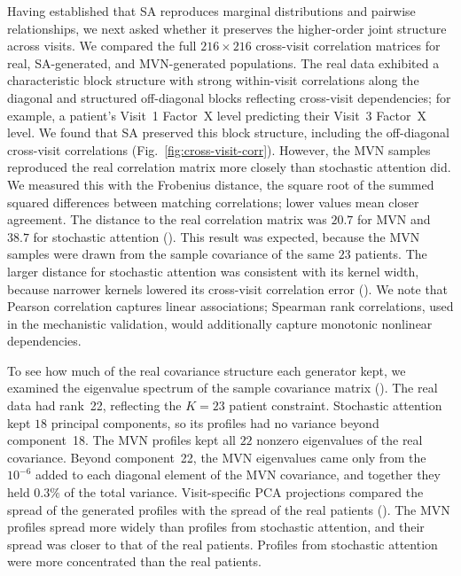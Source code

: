 Having established that SA reproduces marginal distributions and pairwise
relationships, we next asked whether it preserves the higher-order joint structure
across visits. We compared the full $216 \times 216$ cross-visit correlation matrices for real,
SA-generated, and MVN-generated populations. The real data exhibited a characteristic
block structure with strong within-visit correlations along the diagonal and
structured off-diagonal blocks reflecting cross-visit dependencies; for example,
a patient's Visit~1 Factor~X level predicting their Visit~3 Factor~X level. We found
that SA preserved this block structure, including the off-diagonal cross-visit
correlations (Fig.~\ref{fig:cross-visit-corr}). However, the MVN samples reproduced the
real correlation matrix more closely than stochastic attention did. We measured this with the
Frobenius distance, the square root of the summed squared differences between matching
correlations; lower values mean closer agreement. The distance to the real correlation matrix
was $20.7$ for MVN and $38.7$ for stochastic attention
(). This result was expected, because the MVN samples
were drawn from the sample covariance of the same $23$ patients. The larger distance for
stochastic attention was consistent with its kernel width, because narrower kernels lowered its
cross-visit correlation error ().
We note that Pearson correlation captures linear associations; Spearman rank
correlations, used in the mechanistic validation, would additionally capture
monotonic nonlinear dependencies.

To see how much of the real covariance structure each generator kept, we examined the
eigenvalue spectrum of the sample covariance matrix ().
The real data had rank~22, reflecting the $K{=}23$ patient constraint. Stochastic
attention kept $18$ principal components, so its profiles had no variance beyond component~18.
The MVN profiles kept all $22$ nonzero eigenvalues of the real covariance. Beyond
component~22, the MVN eigenvalues came only from the $10^{-6}$ added to each diagonal element
of the MVN covariance, and together they held $0.3\%$ of the total variance. Visit-specific PCA
projections compared the spread of the generated profiles with the spread of the real
patients (). The MVN profiles spread more widely
than profiles from stochastic attention, and their spread was closer to that of the real
patients. Profiles from stochastic attention were more concentrated than the real patients.

